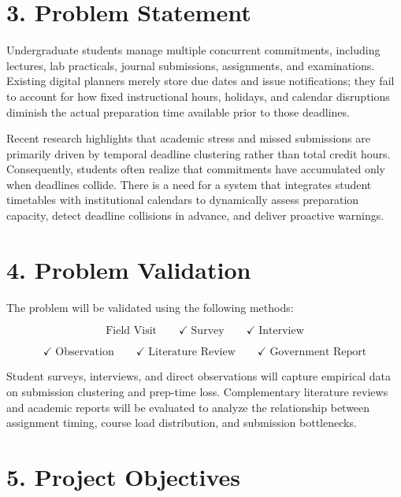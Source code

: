 \documentclass[11pt,a4paper]{article}
\begin{document}

\section*{3. Problem Statement}

Undergraduate students manage multiple concurrent commitments, including lectures, lab practicals, journal submissions, assignments, and examinations. Existing digital planners merely store due dates and issue notifications; they fail to account for how fixed instructional hours, holidays, and calendar disruptions diminish the actual preparation time available prior to those deadlines.

Recent research highlights that academic stress and missed submissions are primarily driven by temporal deadline clustering rather than total credit hours. Consequently, students often realize that commitments have accumulated only when deadlines collide. There is a need for a system that integrates student timetables with institutional calendars to dynamically assess preparation capacity, detect deadline collisions in advance, and deliver proactive warnings.



\section*{4. Problem Validation}

The problem will be validated using the following methods:

\[\text{Field Visit} \qquad \checkmark\; \text{Survey} \qquad \checkmark\; \text{Interview}\]

\[\checkmark\; \text{Observation} \qquad \checkmark\; \text{Literature Review} \qquad \checkmark\; \text{Government Report}\]

Student surveys, interviews, and direct observations will capture empirical data on submission clustering and prep-time loss. Complementary literature reviews and academic reports will be evaluated to analyze the relationship between assignment timing, course load distribution, and submission bottlenecks.



\section*{5. Project Objectives}
\end{document}
